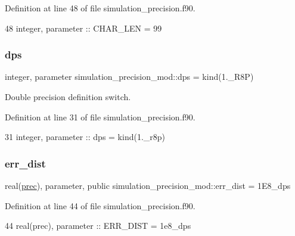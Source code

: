 Definition at line 48 of file simulation\+\_\+precision.\+f90.


\begin{DoxyCode}
48     \textcolor{keywordtype}{integer}, \textcolor{keywordtype}{parameter} :: CHAR\_LEN = 99
\end{DoxyCode}
\mbox{\label{namespacesimulation__precision__mod_afa656a8f79bdee9d705fb5988ae40123}} 
\subsubsection{\texorpdfstring{dps}{dps}}
{\footnotesize\ttfamily integer, parameter simulation\+\_\+precision\+\_\+mod\+::dps = kind(1.\+\_\+\+R8P)\hspace{0.3cm}{\ttfamily [private]}}



Double precision definition switch. 



Definition at line 31 of file simulation\+\_\+precision.\+f90.


\begin{DoxyCode}
31     \textcolor{keywordtype}{integer},  \textcolor{keywordtype}{parameter} :: dps  = kind(1.\_r8p)   
\end{DoxyCode}
\mbox{\label{namespacesimulation__precision__mod_ae3222dd2d51f6b7221be1ca1c70e3e6c}} 
\subsubsection{\texorpdfstring{err\+\_\+dist}{err\_dist}}
{\footnotesize\ttfamily real(\mbox{\hyperlink{namespacesimulation__precision__mod_aaff1ddf996761a1e11e787d63e1612f6}{prec}}), parameter, public simulation\+\_\+precision\+\_\+mod\+::err\+\_\+dist = 1\+E8\+\_\+dps}



Definition at line 44 of file simulation\+\_\+precision.\+f90.


\begin{DoxyCode}
44     \textcolor{keywordtype}{real(prec)}, \textcolor{keywordtype}{parameter} :: ERR\_DIST = 1e8\_dps
\end{DoxyCode}
\mbox{\label{namespacesimulation__precision__mod_a82a4b689dc26018c961193b991c489d4}} 

